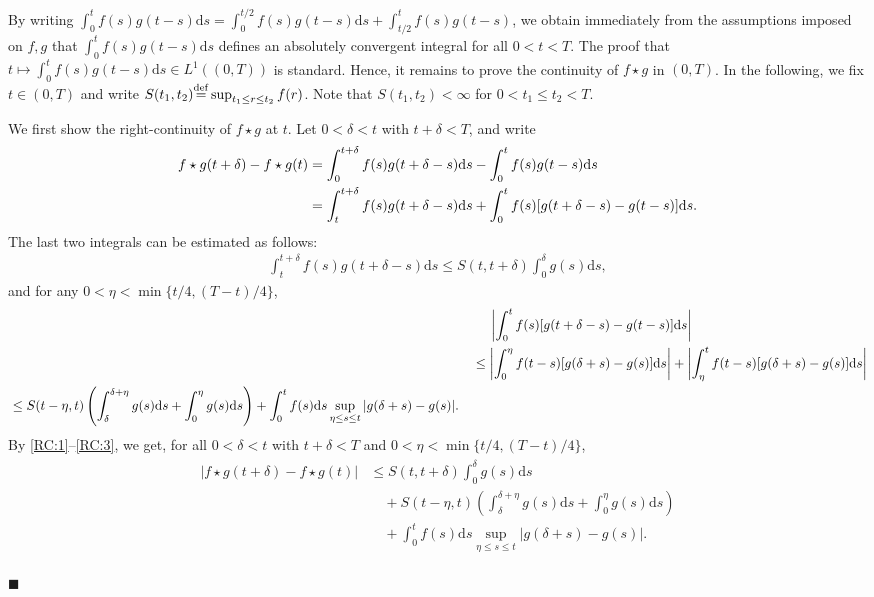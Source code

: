 \documentclass[12pt, twoside]{article}
\numberwithin{figure}{section}
\newcommand{\1}{\mathds 1}
\renewcommand{\d}{{\mathrm d}}
\newcommand{\2}{{\mathbf 1}}
\newcommand{\defeq}{{\stackrel{\rm def}{=}}}
\renewenvironment{proof}[1][\proofname]{\noindent {\bfseries #1.}\;}{\hfill\ensuremath{\blacksquare}\\}
\begin{document}
\begin{proof}
By writing $\int_0^t f(s)g(t-s)\d s=\int_0^{t/2}f(s)g(t-s)\d s+\int_{t/2}^t f(s)g(t-s)$, we obtain immediately from the assumptions imposed on $f,g$ that $\int_0^t f(s)g(t-s)\d s$ defines an absolutely convergent integral for all $0<t<T$. The proof that $t\mapsto \int_0^t f(s)g(t-s)\d s\in L^1((0,T))$ is standard. 
Hence, it remains to prove the continuity of $f\star g$ in $(0,T)$. In the following,
we fix $t\in (0,T)$ and write $S(t_1,t_2)\defeq \sup_{t_1\leq r\leq t_2}f(r)$. Note that $S(t_1,t_2)<\infty$ for $0<t_1\leq t_2<T$.

We first show the right-continuity of $f\star g$ at $t$. Let $0<\delta<t$ with $t+\delta<T$, and write
\begin{align}
f\star g(t+\delta)-f\star g(t)&=\int_0^{t+\delta} f(s)g(t+\delta-s)\d s-\int_0^{t} f(s)g(t-s)\d s\notag\\
&=\int_t^{t+\delta} f(s)g(t+\delta-s)\d s+\int_0^t f(s)[g(t+\delta-s)-g(t-s)]\d s.\label{RC:1}
\end{align}
The last two integrals can be estimated as follows: 
\begin{align}
\int_t^{t+\delta}f(s)g(t+\delta-s)\d s\leq S(t,t+\delta)\int_0^\delta g(s)\d s,\label{RC:2}
\end{align}
and for any $0<\eta<\min\{t/4,(T-t)/4\}$, 
\begin{align}
&\quad\;\left|\int_0^t f(s)[g(t+\delta-s)-g(t-s)]\d s\right|\notag\\
&\leq \left|\int_0^\eta f(t-s)[g(\delta+s)-g(s)]\d s\right|+\left|
\int_\eta^t f(t-s)[g(\delta+s)-g(s)]\d s\right|\notag\\
\begin{split}
&\leq S(t-\eta,t)\left(\int_{\delta}^{\delta+\eta}g(s)\d s+\int_0^{\eta}g(s)\d s\right)+ \int_0^{t}f(s)\d s\sup_{\eta\leq s\leq t}|g(\delta+s)-g(s)|.\label{RC:3}
\end{split}
\end{align}
By \eqref{RC:1}--\eqref{RC:3}, we get, for all $0<\delta<t$ with $t+\delta<T$ and $0<\eta<\min\{t/4,(T-t)/4\}$,
\begin{align}
\begin{split}\label{RC:4}
|f\star g(t+\delta)-f\star g(t)|&\leq S(t,t+\delta)\int_0^{\delta} g(s)\d s\\
&\quad+S(t-\eta,t)
\left(\int_{\delta}^{\delta+\eta}g(s)\d s+\int_0^{\eta}g(s)\d s\right)\\
&\quad+\int_0^t f(s)\d s\sup_{\eta\leq s\leq t}|g(\delta+s)-g(s)|.
\end{split}
\end{align}



\end{proof}
\end{document}
